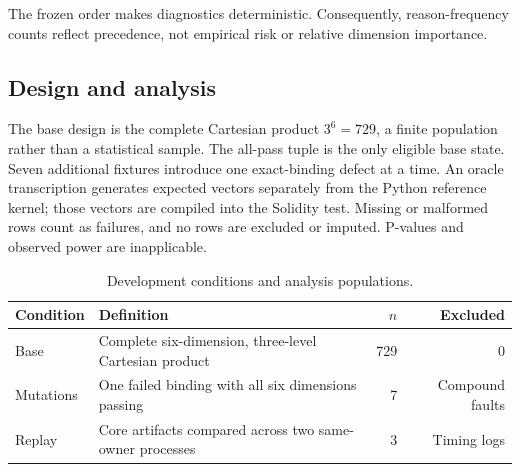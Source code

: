 \documentclass[10pt]{article}
\begin{document}
\begin{center}
\end{center}

The frozen order makes diagnostics deterministic. Consequently, reason-frequency
counts reflect precedence, not empirical risk or relative dimension importance.

\subsection{Design and analysis}

The base design is the complete Cartesian product $3^6=729$, a finite population
rather than a statistical sample. The all-pass tuple is the only eligible base state.
Seven additional fixtures introduce one exact-binding defect at a time. An oracle
transcription generates expected vectors separately from the Python reference kernel;
those vectors are compiled into the Solidity test. Missing or malformed rows count
as failures, and no rows are excluded or imputed. P-values and observed power are
inapplicable.

\begin{table}[t]
\centering
\caption{Development conditions and analysis populations.}
\label{tab:conditions}
\small
\begin{tabularx}{\linewidth}{@{}lYrr@{}}
\toprule
Condition & Definition & $n$ & Excluded \\
\midrule
Base & Complete six-dimension, three-level Cartesian product & 729 & 0 \\
Mutations & One failed binding with all six dimensions passing & 7 & Compound faults \\
Replay & Core artifacts compared across two same-owner processes & 3 & Timing logs \\
\bottomrule
\end{tabularx}
\end{table}
\end{document}
